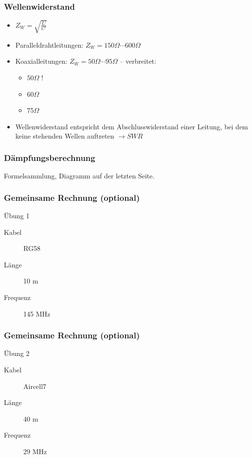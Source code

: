 \begin{frame}
\frametitle{Wellenwiderstand}
\begin{itemize}
	\item \Huge{ $Z_W = \sqrt{\frac{L'}{C'}}$}
	 \normalsize \item Paralleldrahtleitungen: $Z_W = 150 \Omega \cdots 600 \Omega$
	\item Koaxialleitungen: $Z_W =  50 \Omega \cdots 95 \Omega$ -- verbreitet:
    \begin{itemize}
        \item $50 \Omega$ !
        \item $60 \Omega$
        \item $75 \Omega$
    \end{itemize}
	\item Wellenwiderstand entspricht dem Abschlusswiderstand einer Leitung, bei
          dem keine stehenden Wellen auftreten $\rightarrow SWR$
\end{itemize}
\end{frame}

\begin{frame}
\frametitle{Dämpfungsberechnung}
\begin{Large}
Formelsammlung, Diagramm auf der letzten Seite.
\end{Large}
\end{frame}

\begin{frame}
\frametitle{Gemeinsame Rechnung (optional)}
\begin{exampleblock}{Übung 1}
  \begin{description}
 	\item[Kabel] RG58
 	\item[Länge] 10 m
 	\item[Frequenz] 145 MHz
  \end{description}
\end{exampleblock}
\end{frame}

\begin{frame}
\frametitle{Gemeinsame Rechnung (optional)}
\begin{exampleblock}{Übung 2}
  \begin{description}
 	\item[Kabel] Aircell7
 	\item[Länge] 40 m
 	\item[Frequenz] 29 MHz
  \end{description}
\end{exampleblock}
\end{frame}


